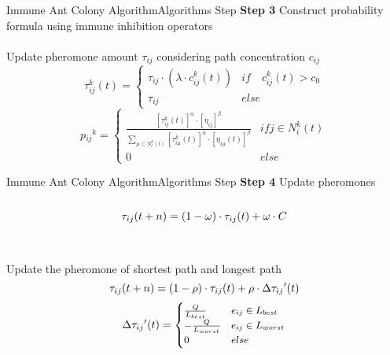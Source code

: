 \documentclass{beamer}
\begin{document}
\begin{frame}{Immune Ant Colony Algorithm}{Algorithms Step}
\large \textbf{Step 3} \normalsize {Construct probability formula using immune inhibition operators}\\~\\
\centering \small {Update pheromone amount $\tau_{ij}$ considering path concentration $c_{ij}$}
\begin{equation}
\tau_{ij}^k(t)=
\begin{cases}
\tau_{ij} \cdot \left(\lambda \cdot c_{ij}^k(t)\right) & if \quad c_{ij}^k(t) > c_0 \\
\tau_{ij} & else
\end{cases}
\end{equation}
\begin{equation}
p{_{ij}}^{k} =
\begin{cases}
\frac{[\tau_{ij}^k(t)]^\alpha \cdot [\eta_{ij}]^\beta} { \sum\limits_{\mu \subset N^k_l(t)} [\tau_{i\mu}^k(t)]^\alpha \cdot [\eta_{i\mu}(t)]^\beta} & if j \in N^k_i(t) \\
0 & else
\end{cases}
\end{equation}
\end{frame}

\begin{frame}{Immune Ant Colony Algorithm}{Algorithms Step}
\large \textbf{Step 4} \normalsize {Update pheromones}\\~\\
\begin{equation} \small{
\tau_{ij}(t+n) = (1-\omega)\cdot\tau_{ij}(t)+\omega\cdot C}
\end{equation} \\~\\
\centering \small {Update the pheromone of shortest path and longest path}
\begin{equation}\small{
\tau_{ij}(t+n) = (1-\rho)\cdot\tau_{ij}(t)+\rho\cdot \Delta{\tau_{ij}}'(t)}
\end{equation}
\begin{equation} \small{
\Delta{\tau_{ij}}'(t) = 
\begin{cases}
\frac{Q}{L_{best}} & e_{ij} \in L_{best} \\
-\frac{Q}{L_{worst}} & e_{ij} \in L_{worst} \\
0 & else
\end{cases}}
\end{equation}
\end{frame}
\end{document}
